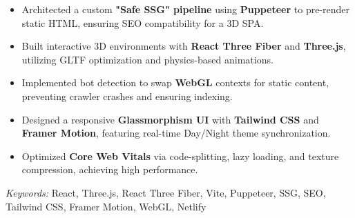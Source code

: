 \nointent
{}

\begin{itemize}
    \item Architected a custom \textbf{"Safe SSG" pipeline} using \textbf{Puppeteer} to pre-render static HTML, ensuring SEO compatibility for a 3D SPA.
    \item Built interactive 3D environments with \textbf{React Three Fiber} and \textbf{Three.js}, utilizing GLTF optimization and physics-based animations.
    \item Implemented bot detection to swap \textbf{WebGL} contexts for static content, preventing crawler crashes and ensuring indexing.
    \item Designed a responsive \textbf{Glassmorphism UI} with \textbf{Tailwind CSS} and \textbf{Framer Motion}, featuring real-time Day/Night theme synchronization.
    \item Optimized \textbf{Core Web Vitals} via code-splitting, lazy loading, and texture compression, achieving high performance.
\end{itemize}

\nointent
\textit{Keywords:} React, Three.js, React Three Fiber, Vite, Puppeteer, SSG, SEO, Tailwind CSS, Framer Motion, WebGL, Netlify
